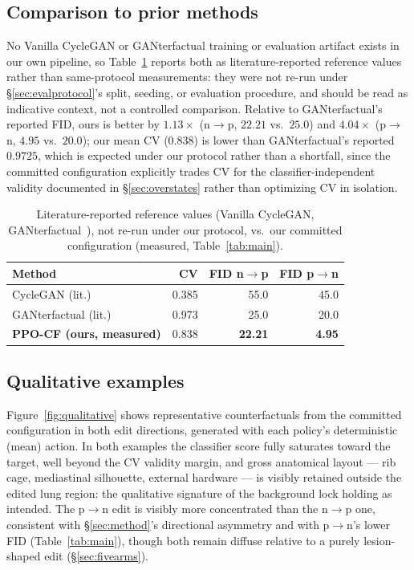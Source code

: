 \documentclass[10pt,twocolumn,letterpaper]{article}
\newcommand{\method}{\textsc{PPO-CF}}
\begin{document}
\subsection{Comparison to prior methods}
\label{sec:comparison}
No Vanilla CycleGAN or GANterfactual training or evaluation artifact
exists in our own pipeline, so Table~\ref{tab:baseline} reports both as
literature-reported reference values rather than same-protocol
measurements: they were not re-run under \S\ref{sec:evalprotocol}'s
split, seeding, or evaluation procedure, and should be read as indicative
context, not a controlled comparison. Relative to GANterfactual's
reported FID, ours is better by $1.13\times$ (n$\to$p, $22.21$ vs.\
$25.0$) and $4.04\times$ (p$\to$n, $4.95$ vs.\ $20.0$); our mean CV
($0.838$) is lower than GANterfactual's reported $0.9725$, which is
expected under our protocol rather than a shortfall, since the committed
configuration explicitly trades CV for the classifier-independent
validity documented in \S\ref{sec:overstates} rather than optimizing CV
in isolation.

\begin{table}[t]
\centering
\small
\caption{Literature-reported reference values (Vanilla CycleGAN,
GANterfactual~\cite{singla2022}), not re-run under our protocol, vs.\ our
committed configuration (measured, Table~\ref{tab:main}).}
\label{tab:baseline}
\begin{tabular}{@{}lrrr@{}}
\toprule
\textbf{Method} & \textbf{CV} & \textbf{FID n$\to$p} & \textbf{FID p$\to$n} \\
\midrule
CycleGAN (lit.) & 0.385 & 55.0 & 45.0 \\
GANterfactual (lit.) & 0.973 & 25.0 & 20.0 \\
\textbf{\method{} (ours, measured)} & 0.838 & \textbf{22.21} & \textbf{4.95} \\
\bottomrule
\end{tabular}
\end{table}

\subsection{Qualitative examples}
\label{sec:qualitative}
Figure~\ref{fig:qualitative} shows representative counterfactuals from
the committed configuration in both edit directions, generated with each
policy's deterministic (mean) action. In both examples the classifier
score fully saturates toward the target, well beyond the CV validity
margin, and gross anatomical layout --- rib cage, mediastinal silhouette,
external hardware --- is visibly retained outside the edited lung region:
the qualitative signature of the background lock holding as intended.
The p$\to$n edit is visibly more concentrated than the n$\to$p one,
consistent with \S\ref{sec:method}'s directional asymmetry and with
p$\to$n's lower FID (Table~\ref{tab:main}), though both remain diffuse
relative to a purely lesion-shaped edit (\S\ref{sec:fivearms}).
\end{document}
